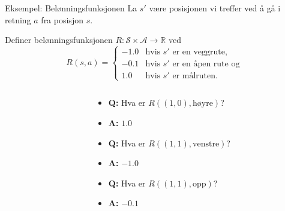 \documentclass[UKenglish]{beamer}
\begin{document}
\begin{frame}{Eksempel: Belønningsfunksjonen}
	La $s'$ være posisjonen vi treffer ved å gå i retning $a$ fra posisjon $s$.
	
	\vspace{1em}
	
	Definer belønningsfunksjonen $R\colon\mathcal{S}\times\mathcal{A}\to\mathbb{R}$ ved
	$$
	R(s,a) = \begin{cases}
		-1.0 & \text{hvis } s'\text{ er en veggrute},\\
		-0.1 & \text{hvis } s'\text{ er en åpen rute og }\\
		1.0 & \text{hvis } s'\text{ er målruten}.
	\end{cases}
	$$
	\begin{columns}
	\begin{column}{0.3\textwidth}
		\begin{center}
			
		\end{center}
	\end{column}
	\begin{column}{0.7\textwidth}%
	\begin{itemize}
		\item\textbf{Q:} Hva er $R((1,0), \text{høyre})$?
		\pause
		\item\textbf{A:} $1.0$
		\pause
		\item\textbf{Q:} Hva er $R((1,1), \text{venstre})$?
		\pause
		\item\textbf{A:} $-1.0$
		\pause
		\item\textbf{Q:} Hva er $R((1,1), \text{opp})$?
		\pause
		\item\textbf{A:} $-0.1$
	\end{itemize}
	\end{column}
	\end{columns}
\end{frame}
\end{document}

